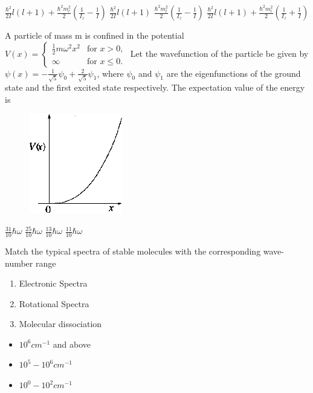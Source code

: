 \documentclass{exam}
\begin{document}
\begin{questions}
\begin{oneparchoices}
	\choice $\frac{\hbar^{2}}{2I}l(l+1)+\frac{\hbar^{2}m_{l}^{2}}{2}(\frac{1}{I_{z}}-\frac{1}{I})$
	\choice $\frac{\hbar^{2}}{2I}l(l+1)$
	\choice $\frac{\hbar^{2}m_{l}^{2}}{2}(\frac{1}{I_{z}}-\frac{1}{I})$
	\choice $\frac{\hbar^{2}}{2I}l(l+1)+\frac{\hbar^{2}m_{l}^{2}}{2}(\frac{1}{I_{z}}+\frac{1}{I})$
\end{oneparchoices}

\question A particle of mass m is confined in the potential $V(x)=\begin{cases} \frac{1}{2}m\omega^{2}x^{2} & \text{for } x>0, \\ \infty & \text{for } x \le 0. \end{cases}$
	Let the wavefunction of the particle be given by $\psi(x)=-\frac{1}{\sqrt{5}}\psi_{0}+\frac{2}{\sqrt{5}}\psi_{1}$, where $\psi_0$ and $\psi_1$ are the eigenfunctions of the ground state and the first excited state respectively. The expectation value of the energy is\hfill{}
	\begin{figure}[H] \centering
		\caption*{} \label{35} \includegraphics[width=0.2\columnwidth]{pics/35.png}
	\end{figure}


\begin{oneparchoices}
	\choice $\frac{31}{10}\hbar\omega$ \choice $\frac{25}{10}\hbar\omega$ \choice $\frac{13}{10}\hbar\omega$ \choice $\frac{11}{10}\hbar\omega$
\end{oneparchoices}

\question Match the typical spectra of stable molecules with the corresponding wave-number range\hfill{}

\begin{multicols}{2}
 \begin{enumerate}
  \item Electronic Spectra
  \item Rotational Spectra
  \item Molecular dissociation
 \end{enumerate}
\columnbreak
\begin{itemize}
 \item $10^6 cm^{-1}$ and above
 \item $10^5 - 10^6 cm^{-1}$
 \item $10^0 - 10^2 cm^{-1}$
\end{itemize}



\end{multicols}
\end{questions}
\end{document}
